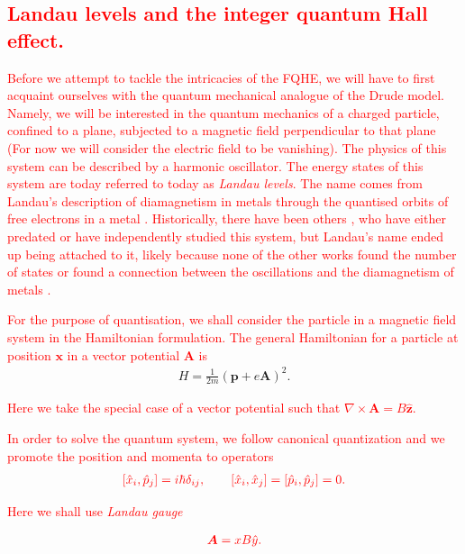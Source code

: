 \textcolor{red}{\subsection{Landau levels and the integer quantum Hall effect.}}

\textcolor{red}{Before we attempt to tackle the intricacies of the FQHE, we will have to first acquaint ourselves with the quantum mechanical analogue of the Drude model. Namely, we will be interested in the quantum mechanics of a charged particle, confined to a plane, subjected to a magnetic field perpendicular to that plane (For now we will consider the electric field to be vanishing). The physics of this system can be described by a harmonic oscillator. The energy states of this system are today referred to today as \textit{Landau levels}. The name comes from Landau's description of diamagnetism in metals through the quanti\textcolor{red}{s}ed orbits of free electrons in a metal \cite{Landau1930}. Historically, there have been others \cite{Rabi1928, Fock1928, FrenkelBronshtein1930}, who have either predated or have independently studied this system, but Landau's name ended up being attached to it, likely because none of the other works found the number of states or found a connection between the oscillations and the diamagnetism of metals \cite{shifman2013under}.}

\textcolor{red}{For the purpose of quantisation, we shall consider the particle in a magnetic field system in the Hamiltonian formulation. The general Hamiltonian for a particle at position $\bm{x}$ in a vector potential $\bm{A}$ is }
\begin{align}
    H=\frac{1}{2m}\left(\bm{p} +e \bm{A} \right)^2.
\end{align}

 \textcolor{red}{Here we take the special case of a vector potential such that $\nabla \times \bm{A} = B \hat{\bm{z}}$.}

\textcolor{red}{In order to solve the quantum system, we follow canonical quantization and we promote the position and momenta to operators}
\begin{align}
    \textcolor{red}{[\hat{x}_i, \hat{p}_j] = i \hbar \delta_{ij}, \qquad [\hat{x}_i, \hat{x}_j]=[\hat{p}_i, \hat{p}_j]=0.}
\end{align}

\textcolor{red}{Here we shall use \textit{Landau gauge}}

\begin{align}
    \textcolor{red}{\bm{A}=  x B\hat{y}.}
\end{align}

